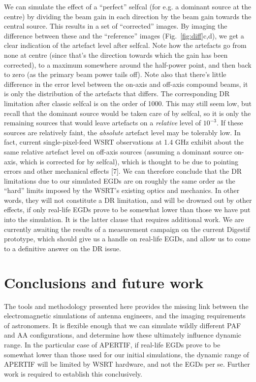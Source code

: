 \documentclass{aps2010} \special{papersize=8.5in,11in}
\begin{document}
We can simulate the effect of a ``perfect'' selfcal (for e.g. a dominant source at the centre) by dividing the beam gain in each direction by the beam gain towards the central source. This results in a set of ``corrected'' images. By imaging the difference between these and the ``reference'' images (Fig.~\ref{fig:diff}c,d), we get a clear indication of the artefact level after selfcal. Note how the artefacts go from none at centre (since that's the direction towards which the gain has been corrected), to a maximum somewhere around the half-power point, and then back to zero (as the primary beam power tails off). Note also that there's little difference in the error level between the on-axis and off-axis compound beams, it is only the distribution of the artefacts that differs. The corresponding DR limitation after classic selfcal is on the order of 1000. This may still seem low, but recall that the dominant source would be taken care of by selfcal, so it is only the remaining sources that would leave artefacts on a \emph{relative} level of $10^{-3}$. If these sources are relatively faint, the \emph{absolute} artefact level may be tolerably low. In fact, current single-pixel-feed WSRT observations at 1.4 GHz exhibit about the same relative artefact level on off-axis sources (assuming a dominant source on-axis, which is corrected for by selfcal), which is thought to be due to pointing errors and other mechanical effects [7]. We can therefore conclude that the DR limitations due to our simulated EGDs are on roughly the same order as the ``hard'' limits imposed by the WSRT's existing optics and mechanics. In other words, they will not constitute a DR limitation, and will be drowned out by other effects, if only real-life EGDs prove to be somewhat lower than those we have put into the simulation. It is the latter clause that requires additional work. We are currently awaiting the results of a measurement campaign on the current Digestif prototype, which should give us a handle on real-life EGDs, and allow us to come to a  definitive answer on the DR issue.

\section{Conclusions and future work}

The tools and methodology presented here provides the missing link between the electromagnetic simulations of antenna engineers, and the  imaging requirements of astronomers. It is flexible enough that we can simulate wildly different PAF and AA configurations, and determine how these ultimately influence dynamic range. In the particular case of APERTIF, if real-life EGDs prove to be somewhat lower than those used for our initial simulations, the dynamic range of APERTIF will be limited by WSRT hardware, and not the EGDs per se. Further work is required to establish this conclusively.
\end{document}
